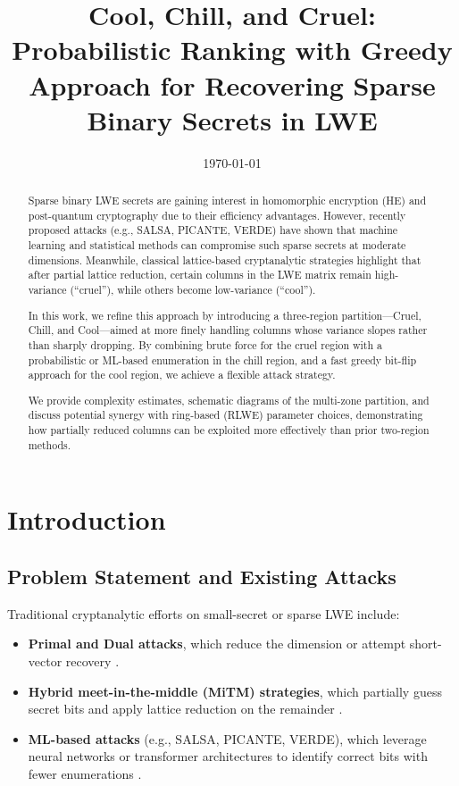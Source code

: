 \documentclass[conference]{IEEEtran}
\title{\fontsize{18}{22}\selectfont Cool, Chill, and Cruel: Probabilistic Ranking with Greedy \\ Approach for Recovering Sparse Binary Secrets in LWE}
\author{\IEEEauthorblockN{MAMANCHUK Mykola, SID.202420671 \\ Supervising Professor: KUNIHIRO Noboru }
\IEEEauthorblockA{University of Tsukuba / CRISEC}
}
\date{\today}
\begin{document}
\maketitle

\begin{abstract}
  Sparse binary LWE secrets are gaining interest in homomorphic encryption (HE) and post-quantum cryptography due to their efficiency advantages. However, recently proposed attacks (e.g., SALSA, PICANTE, VERDE) have shown that machine learning and statistical methods can compromise such sparse secrets at moderate dimensions. Meanwhile, classical lattice-based cryptanalytic strategies highlight that after partial lattice reduction, certain columns in the LWE matrix remain high-variance (“cruel”), while others become low-variance (“cool”). 
  
  In this work, we refine this approach by introducing a three-region partition—Cruel, Chill, and Cool—aimed at more finely handling columns whose variance slopes rather than sharply dropping. By combining brute force for the cruel region with a probabilistic or ML-based enumeration in the chill region, and a fast greedy bit-flip approach for the cool region, we achieve a flexible attack strategy. 
  
  We provide complexity estimates, schematic diagrams of the multi-zone partition, and discuss potential synergy with ring-based (RLWE) parameter choices, demonstrating how partially reduced columns can be exploited more effectively than prior two-region methods.
  \end{abstract}
  
  \section{Introduction}

  \subsection{Problem Statement and Existing Attacks}
  
  Traditional cryptanalytic efforts on small-secret or sparse LWE include:
  
  \begin{itemize}
      \item \textbf{Primal and Dual attacks}, which reduce the dimension or attempt short-vector recovery \cite{primal-dual}.
      \item \textbf{Hybrid meet-in-the-middle (MiTM) strategies}, which partially guess secret bits and apply lattice reduction on the remainder \cite{hybrid-mitm}.
      \item \textbf{ML-based attacks} (e.g., SALSA, PICANTE, VERDE), which leverage neural networks or transformer architectures to identify correct bits with fewer enumerations \cite{salsa, picante, salsa-verde}.
  \end{itemize}
  
\end{document}
